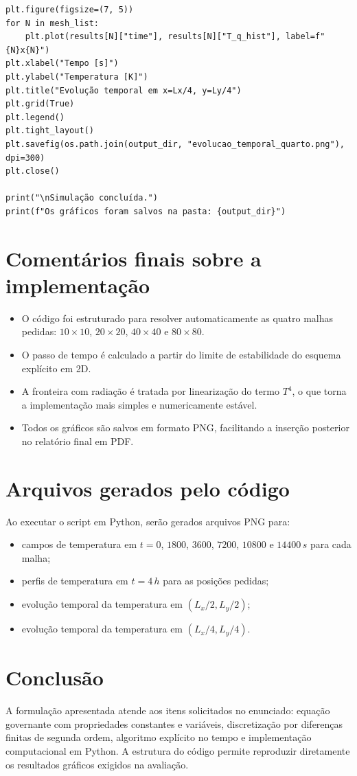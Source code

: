 \documentclass[12pt,a4paper]{article}
\begin{document}
\begin{lstlisting}
plt.figure(figsize=(7, 5))
for N in mesh_list:
    plt.plot(results[N]["time"], results[N]["T_q_hist"], label=f"{N}x{N}")
plt.xlabel("Tempo [s]")
plt.ylabel("Temperatura [K]")
plt.title("Evolução temporal em x=Lx/4, y=Ly/4")
plt.grid(True)
plt.legend()
plt.tight_layout()
plt.savefig(os.path.join(output_dir, "evolucao_temporal_quarto.png"), dpi=300)
plt.close()

print("\nSimulação concluída.")
print(f"Os gráficos foram salvos na pasta: {output_dir}")
\end{lstlisting}

\section{Comentários finais sobre a implementação}
\begin{itemize}[leftmargin=1.2cm]
    \item O código foi estruturado para resolver automaticamente as quatro malhas pedidas: $10\times 10$, $20\times 20$, $40\times 40$ e $80\times 80$.
    \item O passo de tempo é calculado a partir do limite de estabilidade do esquema explícito em 2D.
    \item A fronteira com radiação é tratada por linearização do termo $T^4$, o que torna a implementação mais simples e numericamente estável.
    \item Todos os gráficos são salvos em formato PNG, facilitando a inserção posterior no relatório final em PDF.
\end{itemize}

\section{Arquivos gerados pelo código}
Ao executar o script em Python, serão gerados arquivos PNG para:
\begin{itemize}[leftmargin=1.2cm]
    \item campos de temperatura em $t=0$, $1800$, $3600$, $7200$, $10800$ e $14400\,\si{s}$ para cada malha;
    \item perfis de temperatura em $t=4\,\si{h}$ para as posições pedidas;
    \item evolução temporal da temperatura em $(L_x/2, L_y/2)$;
    \item evolução temporal da temperatura em $(L_x/4, L_y/4)$.
\end{itemize}

\section{Conclusão}
A formulação apresentada atende aos itens solicitados no enunciado: equação governante com propriedades constantes e variáveis, discretização por diferenças finitas de segunda ordem, algoritmo explícito no tempo e implementação computacional em Python. A estrutura do código permite reproduzir diretamente os resultados gráficos exigidos na avaliação.
\end{document}
